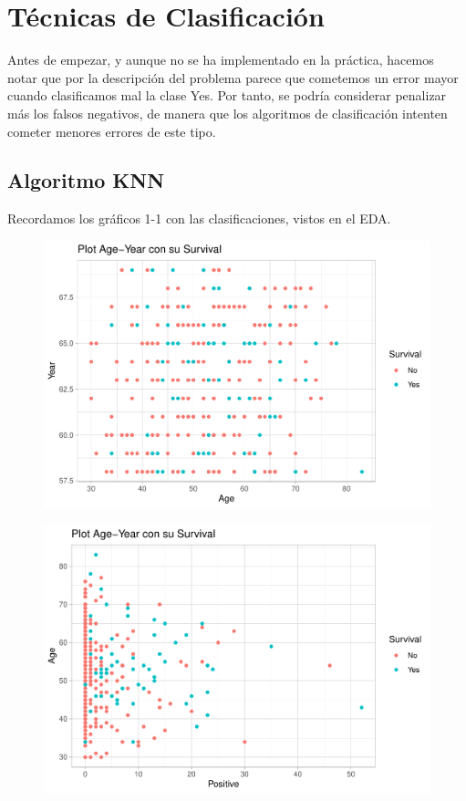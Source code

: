 \section{Técnicas de Clasificación}

Antes de empezar, y aunque no se ha implementado en la práctica, hacemos notar que por la descripción del problema parece que cometemos un error mayor cuando clasificamos mal la clase Yes. Por tanto, se podría considerar penalizar más los falsos negativos, de manera que los algoritmos de clasificación intenten cometer menores errores de este tipo. 

\subsection{Algoritmo KNN}

Recordamos los gráficos 1-1 con las clasificaciones, vistos en el EDA.

\vspace{\baselineskip}

\begin{figure}[H]\center\includegraphics[width=.9\linewidth]{img/Clasificacion_files/figure-latex/unnamed-chunk-5-1}\caption{}\end{figure}

\begin{figure}[H]\center\includegraphics[width=.9\linewidth]{img/Clasificacion_files/figure-latex/unnamed-chunk-5-2}\caption{}\end{figure}

